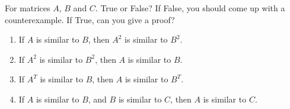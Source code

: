 \documentclass{ximera}
\author{}
\begin{document}
\begin{exercise}

For matrices $A$, $B$ and $C$.  True or False?  If False, you should come up with a counterexample.  If True, can you give a proof?

 \begin{enumerate}
 
 \item If $A$ is similar to $B$, then $A^2$ is similar to $B^2$.
 \begin{multipleChoice}
 \end{multipleChoice}

 \item If $A^2$ is similar to $B^2$, then $A$ is similar to $B$.
 \begin{multipleChoice}
 \end{multipleChoice}

  \item If $A^T$ is similar to $B$, then $A$ is similar to $B^T$.
 \begin{multipleChoice}
 \end{multipleChoice}

 \item If $A$ is similar to $B$, and $B$ is similar to $C$, then $A$ is similar to $C$.
 \begin{multipleChoice}
 \end{multipleChoice}




 \end{enumerate}

 
\end{exercise}
\end{document}
